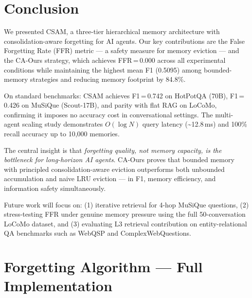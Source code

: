 \documentclass{article}
\begin{document}
\section{Conclusion}
\label{sec:conclusion}

We presented CSAM, a three-tier hierarchical memory architecture with
consolidation-aware forgetting for AI agents.  Our key contributions are the
False Forgetting Rate (FFR) metric — a safety measure for memory eviction —
and the CA-Ours strategy, which achieves FFR\,=\,0.000 across all experimental
conditions while maintaining the highest mean F1 (0.5095) among bounded-memory
strategies and reducing memory footprint by 84.8\%.

On standard benchmarks: CSAM achieves F1\,=\,0.742 on HotPotQA (70B),
F1\,=\,0.426 on MuSiQue (Scout-17B), and parity with flat RAG on LoCoMo,
confirming it imposes no accuracy cost in conversational settings.  The
multi-agent scaling study demonstrates $O(\log N)$ query latency
(\textasciitilde{}12.8\,ms) and 100\% recall accuracy up to 10,000 memories.

The central insight is that \emph{forgetting quality, not memory capacity,
is the bottleneck for long-horizon AI agents}.  CA-Ours proves that
bounded memory with principled consolidation-aware eviction outperforms both
unbounded accumulation and naive LRU eviction — in F1, memory efficiency,
and information safety simultaneously.

Future work will focus on: (1) iterative retrieval for 4-hop MuSiQue questions,
(2) stress-testing FFR under genuine memory pressure using the full 50-conversation
LoCoMo dataset, and (3) evaluating L3 retrieval contribution on entity-relational
QA benchmarks such as WebQSP and ComplexWebQuestions.




\appendix

\section{Forgetting Algorithm — Full Implementation}
\label{app:algorithm}
\end{document}
